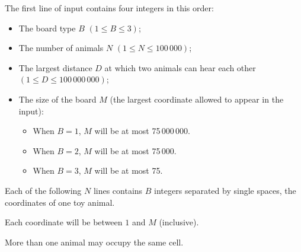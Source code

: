 The first line of input contains four integers in this order:

\begin{itemize}
\item The board type $B$ $(1 \le B \le 3)$;

\item The number of animals $N$ $(1 \le N \le 100\,000)$;

\item The largest distance $D$ at which two animals can hear each other $(1 \le D \le 100\,000\,000)$;

\item The size of the board $M$ (the largest coordinate allowed to appear in the input):

\begin{itemize}
\item When $B=1$, $M$ will be at most 75\,000\,000.

\item When $B=2$, $M$ will be at most 75\,000.

\item When $B=3$, $M$ will be at most 75.
\end{itemize}
\end{itemize}

Each of the following $N$ lines contains $B$ integers separated by single spaces, the coordinates of one toy animal.

Each coordinate will be between $1$ and $M$ (inclusive).

More than one animal may occupy the same cell.